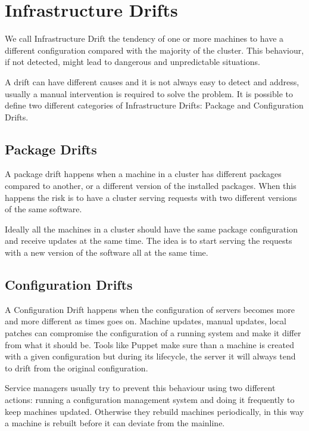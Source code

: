 \section{Infrastructure Drifts}

We call Infrastructure Drift the tendency of one or more machines to have
a different configuration compared with the majority of the cluster. This
behaviour, if not detected, might lead to dangerous and unpredictable
situations.

A drift can have different causes and it is not always easy to detect and
address, usually a manual intervention is required to solve the problem.
It is possible to define two different categories of Infrastructure
Drifts: Package and Configuration Drifts.

\subsection{Package Drifts}

A package drift happens when a machine in a cluster has different packages
compared to another, or a different version of the installed packages.
When this happens the risk is to have a cluster serving requests with two
different versions of the same software.

Ideally all the machines in a cluster should have the same package
configuration and receive updates at the same time. The idea is to start
serving the requests with a new version of the software all at the same
time. 

\subsection{Configuration Drifts}

A Configuration Drift happens when the configuration of servers becomes
more and more different as times goes on. Machine updates, manual updates,
local patches can compromise the configuration of a running system and
make it differ from what it should be. Tools like Puppet make sure than
a machine is created with a given configuration but during its lifecycle,
the server it will always tend to drift from the original configuration.

Service managers usually try to prevent this behaviour using two different
actions: running a configuration management system and doing it frequently
to keep machines updated. Otherwise they rebuild machines periodically, in
this way a machine is rebuilt before it can deviate from the mainline.
